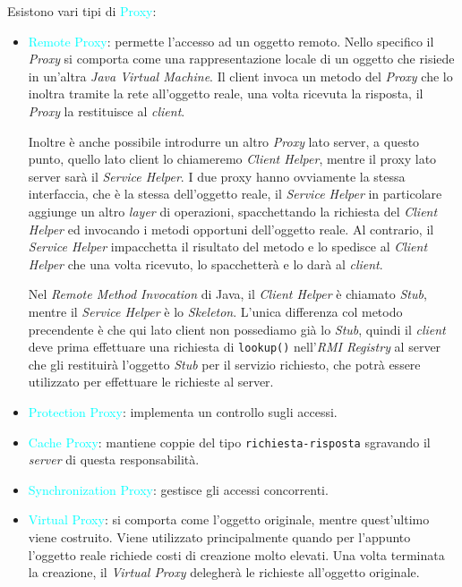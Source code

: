 Esistono vari tipi di \textcolor{cyan}{Proxy}:
\begin{itemize}
    \item \textcolor{cyan}{Remote Proxy}: permette l'accesso ad un oggetto remoto.
        Nello specifico il \emph{Proxy} si comporta come una rappresentazione locale di un oggetto
        che risiede in un'altra \emph{Java Virtual Machine}. Il client invoca un
        metodo del \emph{Proxy} che lo inoltra tramite la rete all'oggetto reale, una volta ricevuta la risposta, il
        \emph{Proxy} la restituisce al \emph{client}.

        Inoltre è anche possibile introdurre un altro \emph{Proxy} lato server,
        a questo punto, quello lato client lo chiameremo \emph{Client Helper}, mentre
        il proxy lato server sarà il \emph{Service Helper}. I due proxy hanno
        ovviamente la stessa interfaccia, che è la stessa dell'oggetto reale, il \emph{Service Helper}
        in particolare aggiunge un altro \emph{layer} di operazioni, spacchettando la richiesta
        del \emph{Client Helper} ed invocando i metodi opportuni dell'oggetto reale. Al contrario,
        il \emph{Service Helper} impacchetta il risultato del metodo e lo spedisce al \emph{Client Helper}
        che una volta ricevuto, lo spacchetterà e lo darà al \emph{client}.

        Nel \emph{Remote Method Invocation} di Java, il \emph{Client Helper} è chiamato
        \emph{Stub}, mentre il \emph{Service Helper} è lo \emph{Skeleton}. L'unica differenza col
        metodo precendente è che qui lato client non possediamo già lo \emph{Stub}, quindi
        il \emph{client} deve prima effettuare una richiesta di \verb|lookup()| nell'\emph{RMI Registry} al server che gli restituirà
        l'oggetto \emph{Stub} per il servizio richiesto, che potrà essere utilizzato per effettuare le richieste al server.
    \item \textcolor{cyan}{Protection Proxy}: implementa un controllo sugli accessi.
    \item \textcolor{cyan}{Cache Proxy}: mantiene coppie del tipo \verb|richiesta-risposta| sgravando
        il \emph{server} di questa responsabilità.
    \item \textcolor{cyan}{Synchronization Proxy}: gestisce gli accessi concorrenti.
    \item \textcolor{cyan}{Virtual Proxy}: si comporta come l'oggetto originale, mentre quest'ultimo viene
        costruito. Viene utilizzato principalmente quando per l'appunto l'oggetto reale
        richiede costi di creazione molto elevati. Una volta terminata la creazione, il \emph{Virtual Proxy}
        delegherà le richieste all'oggetto originale.
\end{itemize}

